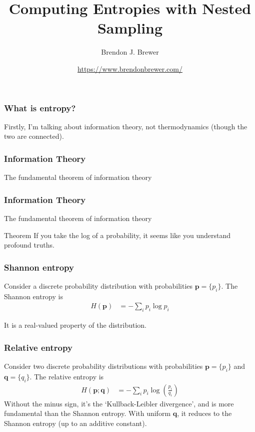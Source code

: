 \documentclass{beamer}
\title{Computing Entropies with Nested Sampling}
\author{Brendon J. Brewer}
\institute{Department of Statistics\\
The University of Auckland}
\date{\color{blue}\url{https://www.brendonbrewer.com/}}
\begin{document}
\frame{\titlepage}


\begin{frame}
\frametitle{What is entropy?}

Firstly, I'm talking about information theory, not thermodynamics (though the
two are connected).

\end{frame}

\begin{frame}
\frametitle{Information Theory}

The fundamental theorem of information theory

\end{frame}


\begin{frame}
\frametitle{Information Theory}

The fundamental theorem of information theory
\begin{block}{Theorem}
If you take the log of a probability, it seems like you understand profound
truths.
\end{block}


\end{frame}


\begin{frame}
\frametitle{Shannon entropy}

Consider a discrete probability distribution with probabilities
$\boldsymbol{p} = \{p_i\}$. The Shannon entropy is
\begin{align}
H(\boldsymbol{p}) &= -\sum_i p_i \log p_i
\end{align}

It is a real-valued property of the distribution.

\end{frame}



\begin{frame}
\frametitle{Relative entropy}

Consider two discrete probability distributions with probabilities
$\boldsymbol{p} = \{p_i\}$ and $\boldsymbol{q} = \{q_i\}$.
The relative entropy is
\begin{align}
H(\boldsymbol{p}; \boldsymbol{q}) &= -\sum_i p_i \log\left(\frac{p_i}{q_i}\right)
\end{align}
Without the minus sign,
it's the `Kullback-Leibler divergence', and is more fundamental than the
Shannon entropy. With uniform $\boldsymbol{q}$, it reduces to the Shannon
entropy (up to an additive constant).
\end{frame}
\end{document}
